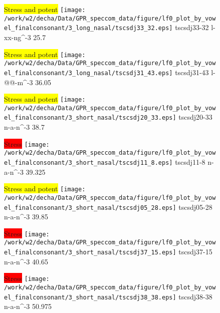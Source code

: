 \documentclass{article}
\begin{document}
\begin{figure}[t]
\begin{minipage}[b]{.24\textwidth}
\colorbox{yellow}{Stress and potent}
\centering
\texttt{[image: /work/w2/decha/Data/GPR\_speccom\_data/figure/lf0\_plot\_by\_vowel\_finalconsonant/3\_long\_nasal/tscsdj33\_32.eps]}
tscsdj33-32 l-xx-ng\textasciicircum-3 25.7
\end{minipage}
\begin{minipage}[b]{.24\textwidth}
\colorbox{yellow}{Stress and potent}
\centering
\texttt{[image: /work/w2/decha/Data/GPR\_speccom\_data/figure/lf0\_plot\_by\_vowel\_finalconsonant/3\_long\_nasal/tscsdj31\_43.eps]}
tscsdj31-43 l-@@-m\textasciicircum-3 36.05
\end{minipage}
\begin{minipage}[b]{.24\textwidth}
\colorbox{yellow}{Stress and potent}
\centering
\texttt{[image: /work/w2/decha/Data/GPR\_speccom\_data/figure/lf0\_plot\_by\_vowel\_finalconsonant/3\_short\_nasal/tscsdj20\_33.eps]}
tscsdj20-33 n-a-n\textasciicircum-3 38.7
\end{minipage}
\begin{minipage}[b]{.24\textwidth}
\colorbox{red}{Stress}
\centering
\texttt{[image: /work/w2/decha/Data/GPR\_speccom\_data/figure/lf0\_plot\_by\_vowel\_finalconsonant/3\_short\_nasal/tscsdj11\_8.eps]}
tscsdj11-8 n-a-n\textasciicircum-3 39.325
\end{minipage}
\end{figure}

\begin{figure}[t]
\begin{minipage}[b]{.24\textwidth}
\colorbox{yellow}{Stress and potent}
\centering
\texttt{[image: /work/w2/decha/Data/GPR\_speccom\_data/figure/lf0\_plot\_by\_vowel\_finalconsonant/3\_short\_nasal/tscsdj05\_28.eps]}
tscsdj05-28 n-a-n\textasciicircum-3 39.85
\end{minipage}
\begin{minipage}[b]{.24\textwidth}
\colorbox{red}{Stress}
\centering
\texttt{[image: /work/w2/decha/Data/GPR\_speccom\_data/figure/lf0\_plot\_by\_vowel\_finalconsonant/3\_short\_nasal/tscsdj37\_15.eps]}
tscsdj37-15 n-a-n\textasciicircum-3 40.65
\end{minipage}
\begin{minipage}[b]{.24\textwidth}
\colorbox{red}{Stress}
\centering
\texttt{[image: /work/w2/decha/Data/GPR\_speccom\_data/figure/lf0\_plot\_by\_vowel\_finalconsonant/3\_short\_nasal/tscsdj38\_38.eps]}
tscsdj38-38 n-a-n\textasciicircum-3 50.975
\end{minipage}
\end{figure}
\end{document}
